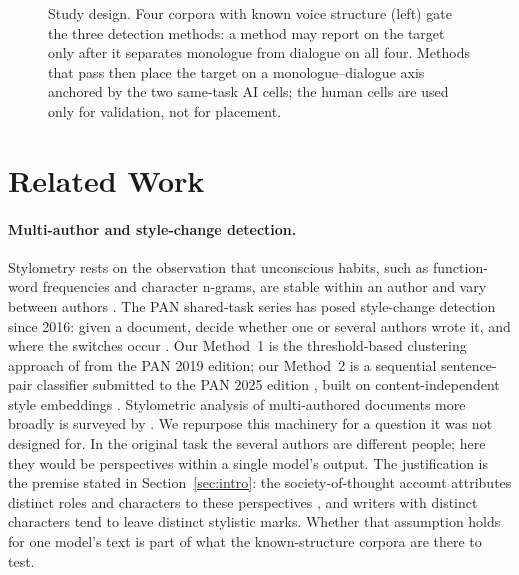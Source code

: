 \documentclass[11pt]{article}
\newcommand{\cellad}{\textsc{ai-dia}}
\newcommand{\cellam}{\textsc{ai-mono}}
\begin{document}
\begin{figure}[t]
\caption{Study design. Four corpora with known voice structure (left) gate
the three detection methods: a method may report on the target only after it
separates monologue from dialogue on all four. Methods that pass then place
the target on a monologue--dialogue axis anchored by the two same-task AI
cells; the human cells are used only for validation, not for placement.}
\label{fig:design}
\end{figure}

\section{Related Work}
\label{sec:related}

\paragraph{Multi-author and style-change detection.}
Stylometry rests on the observation that unconscious habits, such as
function-word frequencies and character n-grams, are stable within an author and vary between
authors \citep{stamatatos2008survey}. The PAN shared-task series has posed
style-change detection since 2016: given a document, decide whether one or
several authors wrote it, and where the switches occur
\citep{zangerle2019pan, zangerle2025pan}. Our Method~1 is the threshold-based
clustering approach of \citet{nath2019style} from the PAN 2019 edition; our
Method~2 is a sequential sentence-pair classifier submitted to the PAN 2025
edition \citep{schmidt2025sspc}, built on content-independent style
embeddings \citep{patel2025styledistance}. Stylometric analysis of
multi-authored documents more broadly is surveyed by
\citet{zamir2024stylometry}. We repurpose this machinery for a question it was
not designed for. In the original task the several authors are different
people; here they would be perspectives within a single model's output. The
justification is the premise stated in Section~\ref{sec:intro}: the
society-of-thought account attributes distinct roles and characters to these
perspectives \citep{kim2026societies}, and writers with distinct characters
tend to leave distinct stylistic marks. Whether that assumption holds for one
model's text is part of what the known-structure corpora are there to test.
\end{document}
